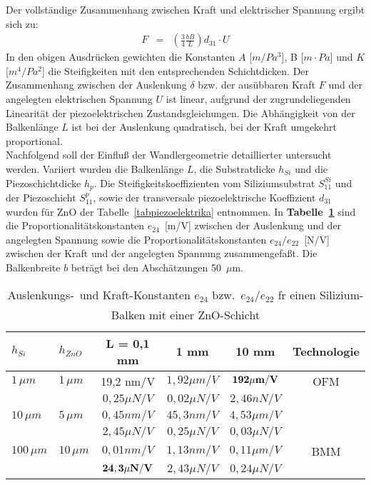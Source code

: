 Der vollständige Zusammenhang zwischen Kraft und elektrischer Spannung
ergibt sich zu:
\begin{eqnarray}
\label{kraftU}
      F & = & \left( \frac{3}{4} \frac{bB}{L} \right) d_{31} \cdot U
\end{eqnarray}
%
In den obigen Ausdrücken gewichten die Konstanten $A$
[$m/Pa^{3}$], B [$m \cdot Pa$] und $K$ [$m^{4}/Pa^{2}$] die
Steifigkeiten mit den entsprechenden Schichtdicken.  Der Zusammenhang
zwischen der Auslenkung $\delta$ bzw. der ausübbaren Kraft $F$ und der
angelegten elektrischen Spannung $U$ ist linear, aufgrund der
zugrundeliegenden Linearität der piezoelektrischen Zustandsgleichungen.
Die Abhängigkeit von
der Balkenlänge $L$ ist bei der Auslenkung quadratisch, bei der Kraft
umgekehrt proportional. \\
Nachfolgend soll der Einfluß der Wandlergeometrie detaillierter
untersucht werden.
Variiert wurden die Balkenlänge $L$, die Substratdicke $h_{Si}$ und die
Piezoschichtdicke $h_{p}$.
Die Steifigkeitskoeffizienten vom Siliziumsubstrat $ S_{11}^{Si} $ und
der Piezoschicht $S_{11}^{p}$, sowie der transversale piezoelektrische
Koeffizient $d_{31}$ wurden für ZnO der Tabelle~\ref{tabpiezoelektrika}
entnommen. In {\bf Tabelle~\ref{tabauslkraftkonst}} sind die
Proportionalitätskonstanten $e_{24}$~[m/V]
zwischen der Auslenkung und der angelegten Spannung sowie
die Proportionalitätskonstanten $e_{24}/e_{22}$~[N/V] zwischen der Kraft
und der angelegten Spannung zusammengefaßt. Die Balkenbreite $b$ beträgt
bei den Abschätzungen 50~$\mu$m.
\begin{table}[htb]
\caption{\label{tabauslkraftkonst}
 Auslenkungs-\ und Kraft-Konstanten $e_{24}$ bzw.\ $ e_{24}/e_{22} $ fr
 einen Silizium-Balken mit einer ZnO-Schicht}
\begin{center}
\begin{tabular}{|l|l||c|c|c|c|} \hline
$h_{Si}$ & $h_{ZnO}$ & L = 0,1 mm  & 1 mm  & 10 mm & Technologie \\
\hline \hline
$ 1 \, \mu m $  &  $ 1 \, \mu m $  &  19,2 nm/V  & $ 1,92 \mu m/V $ &
$ {\bf 192 \mu  m/V} $ & OFM \\  \cline{3-5}
   &  & $ 0,25  \mu N/V $ & $ 0,02  \mu N/V $ & $ 2,46 nN/V $ & \\
\hline \hline
$  10 \, \mu m $  & $ 5 \, \mu m $  & $ 0,45 nm/V $  & $ 45,3 nm/V $
& $ 4,53  \mu m/V $ &  \\  \cline{3-5}
   &  & $ 2,45  \mu N/V $  &  $ 0,25  \mu N/V $  &  $ 0,03  \mu N/V $
   & \\
\cline{1-5}
$ 100 \, \mu m $  &  $ 10 \, \mu m $  & $ 0,01 nm/V  $ & $ 1,13 nm/V $
& $ 0,11 \mu m/V $ & BMM \\  \cline{3-5}
   & & ${\bf 24,3 \mu N/V}$  &  $2,43 \mu N/V$ & $0,24 \mu N/V $ & \\
\hline
\end{tabular}
\end{center}
\end{table}
